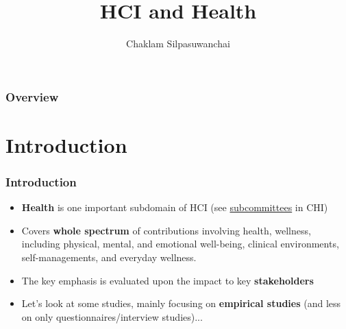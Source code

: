 \documentclass{beamer}
\title[HCI and Health]{HCI and Health} %
\author{Chaklam Silpasuwanchai} %
\institute[AIT] %
{
Asian Institute of Technology \\ %
\medskip
\textit{chaklam@ait.asia} %
}
\date{} %
\begin{document}
\begin{frame}
\titlepage %
\end{frame}

\begin{frame}
\frametitle{Overview} %
\tableofcontents %
\end{frame}




\section{Introduction}

\begin{frame}
\frametitle{Introduction} 
\begin{itemize}
	\item \textbf{Health} is one important subdomain of HCI (see \href{https://chi2022.acm.org/for-authors/presenting/papers/selecting-a-subcommittee/} {subcommittees} in CHI)
	\item Covers \textbf{whole spectrum} of contributions involving health, wellness, including physical, mental, and emotional well-being, clinical environments, self-managements, and everyday wellness.
	\item The key emphasis is evaluated upon the impact to key \textbf{stakeholders}
	\item Let's look at some studies, mainly focusing on \textbf{empirical studies} (and less on only questionnaires/interview studies)...
\end{itemize}

\end{frame}
\end{document}
